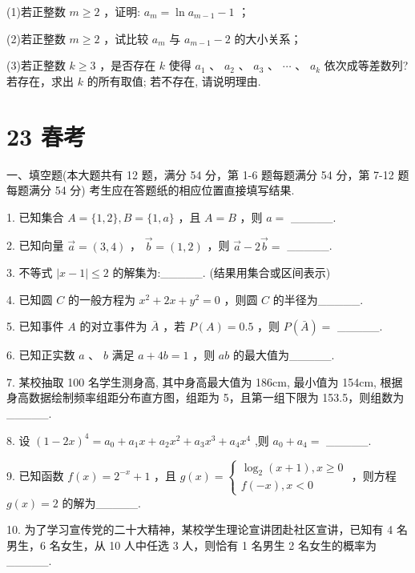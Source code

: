 \documentclass[10pt]{article}
\begin{document}
(1)若正整数 \(m \geq  2\) ，证明: \({a}_{m} = \ln {a}_{m - 1} - 1\) ；

(2)若正整数 \(m \geq  2\) ，试比较 \({a}_{m}\) 与 \({a}_{m - 1} - 2\) 的大小关系；

(3)若正整数 \(k \geq  3\) ，是否存在 \(k\) 使得 \({a}_{1}\text{ 、 }{a}_{2}\text{ 、 }{a}_{3}\text{ 、 }\cdots \text{ 、 }{a}_{k}\) 依次成等差数列? 若存在，求出 \(k\) 的所有取值; 若不存在, 请说明理由.

\section*{23 春考}

一、填空题(本大题共有 12 题，满分 54 分，第 1-6 题每题满分 54 分，第 7-12 题每题满分 54 分) 考生应在答题纸的相应位置直接填写结果.

1. 已知集合 \(A = \{ 1,2\} ,B = \{ 1,a\}\) ，且 \(A = B\) ，则 \(a =\) \_\_\_\_\_.

2. 已知向量 \(\overrightarrow{a} = \left( {3,4}\right)\) ， \(\overrightarrow{b} = \left( {1,2}\right)\) ，则 \(\overrightarrow{a} - 2\overrightarrow{b} =\) \_\_\_\_\_.

3. 不等式 \(\left| {x - 1}\right|  \leq  2\) 的解集为:\_\_\_\_\_. (结果用集合或区间表示)

4. 已知圆 \(C\) 的一般方程为 \({x}^{2} + {2x} + {y}^{2} = 0\) ，则圆 \(C\) 的半径为\_\_\_\_\_.

5. 已知事件 \(A\) 的对立事件为 \(\bar{A}\) ，若 \(P\left( A\right)  = {0.5}\) ，则 \(P\left( \bar{A}\right)  =\) \_\_\_\_\_.

6. 已知正实数 \(a\) 、 \(b\) 满足 \(a + {4b} = 1\) ，则 \({ab}\) 的最大值为\_\_\_\_\_.

7. 某校抽取 100 名学生测身高, 其中身高最大值为 186cm, 最小值为 154cm, 根据身高数据绘制频率组距分布直方图，组距为 5，且第一组下限为 153.5，则组数为\_\_\_\_\_.

8. 设 \({\left( 1 - 2x\right) }^{4} = {a}_{0} + {a}_{1}x + {a}_{2}{x}^{2} + {a}_{3}{x}^{3} + {a}_{4}{x}^{4}\) ,则 \({a}_{0} + {a}_{4} =\) \_\_\_\_\_.

9. 已知函数 \(f\left( x\right)  = {2}^{-x} + 1\) ，且 \(g\left( x\right)  = \left\{  \begin{array}{l} {\log }_{2}\left( {x + 1}\right) ,x \geq  0 \\  f\left( {-x}\right) ,x < 0 \end{array}\right.\) ，则方程 \(g\left( x\right)  = 2\) 的解为\_\_\_\_\_.

10. 为了学习宣传党的二十大精神，某校学生理论宣讲团赴社区宣讲，已知有 4 名男生，6 名女生，从 10 人中任选 3 人，则恰有 1 名男生 2 名女生的概率为\_\_\_\_\_.
\end{document}
